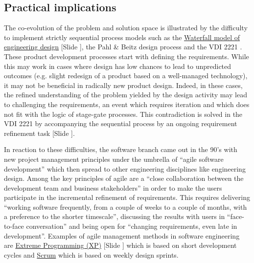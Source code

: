 \documentclass{article}
\newcounter{slide}
\begin{document}
\subsection{Practical implications}
\label{sec:practicalimplicationstwo}

The co-evolution of the problem and solution space is illustrated by the difficulty to implement strictly sequential process models such as the \href{https://en.wikipedia.org/wiki/Waterfall\_model}{Waterfall model of engineering design} {\color{blue}[Slide ]}, the Pahl \& Beitz design process \cite{pahlEngineeringDesignSystematic2007} and the VDI 2221 \cite{vdi1993design}. These product development processes start with defining the requirements. While this may work in cases where design has low chances to lead to unpredicted outcomes (e.g. slight redesign of a product based on a well-managed technology), it may not be beneficial in radically new product design. Indeed, in these cases, the refined understanding of the problem yielded by the design activity may lead to challenging the requirements, an event which requires iteration and which does not fit with the logic of stage-gate processes. This contradiction is solved in the VDI 2221 by accompanying the sequential process by an ongoing requirement refinement task \cite{vdi1993design} {\color{blue}[Slide ]}.

In reaction to these difficulties, the software branch came out in the 90's with new project management principles under the umbrella of ``agile software development'' \cite{beck2001manifesto} which then spread to other engineering disciplines like engineering design. Among the key principles of agile are a ``close collaboration between the development team and business stakeholders'' in order to make the users participate in the incremental refinement of requirements. This requires delivering ``working software frequently, from a couple of weeks to a couple of months, with a preference to the shorter timescale'', discussing the results with users in ``face-to-face conversation'' and being open for ``changing requirements, even late in development''. Examples of agile management methods in software engineering are \href{https://en.wikipedia.org/wiki/Extreme_programming}{Extreme Programming (XP)} {\color{blue}[Slide ]} which is based on short development cycles and \href{https://en.wikipedia.org/wiki/Scrum_(software_development)}{Scrum} which is based on weekly design sprints.
\end{document}
